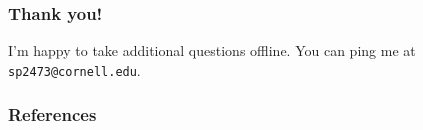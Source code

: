 \documentclass[usenames, dvipsnames, t, table]{beamer}
\newcommand{\eps}{\epsilon}
\begin{document}

  \begin{frame}
    \frametitle{Thank you!}
    I'm happy to take additional questions offline. You can ping me at \texttt{sp2473@cornell.edu}.
  \end{frame}

  \begin{frame}[allowframebreaks]
    \frametitle{References}
    
    
  \end{frame}

\end{document}

